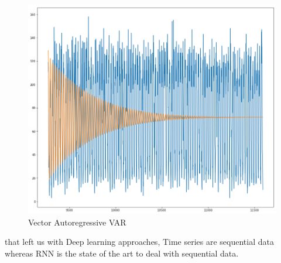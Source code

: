 \begin{figure}[H]
\centering
\includegraphics[scale=.2]{img/VAR.png} 
\caption{Vector Autoregressive VAR}
\label{fig:arima_degree}
\end{figure}

that left us with Deep learning approaches, Time series are sequential data whereas RNN is the state of the art to deal with sequential data.

